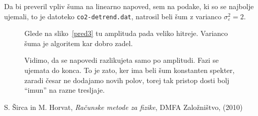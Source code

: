 \documentclass[a4 paper, 12pt]{article}
\newcommand{\e}{
	\ensuremath{\varepsilon}
}
\begin{document}
Da bi preveril vpliv \v suma na linearno napoved, sem na podake, ki so se najbolje ujemali,
to je datoteko {\tt co2-detrend.dat}, natrosil beli \v sum z varianco $\sigma_\e^2 = 2$.
\begin{figure}[H]\centering
	
	\caption{Glede na sliko~\ref{pred3} tu amplituda pada veliko hitreje. Varianco \v suma je algoritem
		kar dobro zadel.}
	\label{pred8}
\end{figure}

\begin{figure}[H]\centering
	
	\caption{Vidimo, da se napovedi razlikujeta samo po amplitudi. Fazi se ujemata do konca. To je zato,
		ker ima beli \v sum konstanten spekter, zaradi \v cesar ne dodajamo novih polov, torej tak
		pristop dosti bolj "`imun"' na razne tresljaje.}
	\label{pred9}
\end{figure}

\begin{thebibliography}{9}
		S. \v Sirca in M. Horvat,
		{\em Ra\v cunske metode za fizike},
		DMFA Zalo\v zni\v stvo,
		(2010)
\end{thebibliography}
\end{document}
